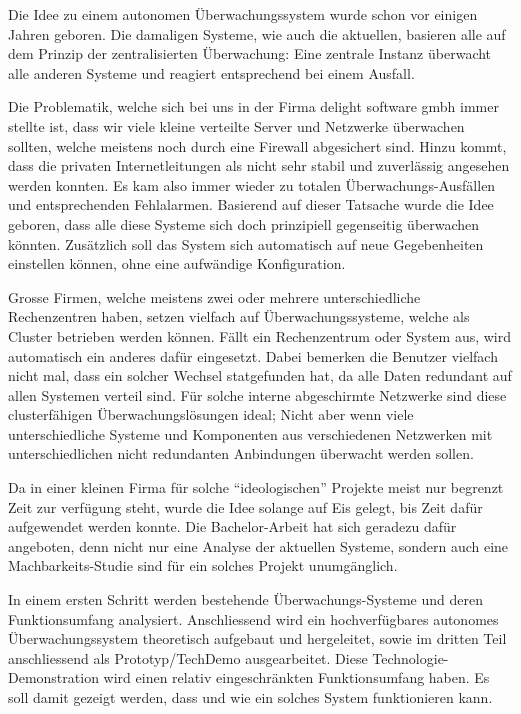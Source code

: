 
Die Idee zu einem autonomen \"Uberwachungssystem wurde schon vor einigen Jahren geboren. Die damaligen Systeme, wie auch die aktuellen, basieren alle auf dem Prinzip der zentralisierten \"Uberwachung: Eine zentrale Instanz \"uberwacht alle anderen Systeme und reagiert entsprechend bei einem Ausfall.

Die Problematik, welche sich bei uns in der Firma delight software gmbh immer stellte ist, dass wir viele kleine verteilte Server und Netzwerke \"uberwachen sollten, welche meistens noch durch eine Firewall abgesichert sind. Hinzu kommt, dass die privaten Internetleitungen als nicht sehr stabil und zuverl\"assig angesehen werden konnten. Es kam also immer wieder zu totalen \"Uberwachungs-Ausf\"allen und entsprechenden Fehlalarmen. Basierend auf dieser Tatsache wurde die Idee geboren, dass alle diese Systeme sich doch prinzipiell gegenseitig \"uberwachen k\"onnten. Zus\"atzlich soll das System sich automatisch auf neue Gegebenheiten einstellen k\"onnen, ohne eine aufw\"andige Konfiguration.

Grosse Firmen, welche meistens zwei oder mehrere unterschiedliche Rechenzentren haben, setzen vielfach auf \"Uberwachungssysteme, welche als Cluster betrieben werden k\"onnen. F\"allt ein Rechenzentrum oder System aus, wird automatisch ein anderes daf\"ur eingesetzt. Dabei bemerken die Benutzer vielfach nicht mal, dass ein solcher Wechsel statgefunden hat, da alle Daten redundant auf allen Systemen verteil sind. F\"ur solche interne abgeschirmte Netzwerke sind diese clusterf\"ahigen \"Uberwachungsl\"osungen ideal; Nicht aber wenn viele unterschiedliche Systeme und Komponenten aus verschiedenen Netzwerken mit unterschiedlichen nicht redundanten Anbindungen \"uberwacht werden sollen.

Da in einer kleinen Firma f\"ur solche "`ideologischen"' Projekte meist nur begrenzt Zeit zur verf\"ugung steht, wurde die Idee solange auf Eis gelegt, bis Zeit daf\"ur aufgewendet werden konnte. Die Bachelor-Arbeit hat sich geradezu daf\"ur angeboten, denn nicht nur eine Analyse der aktuellen Systeme, sondern auch eine Machbarkeits-Studie sind f\"ur ein solches Projekt unumg\"anglich.

In einem ersten Schritt werden bestehende \"Uberwachungs-Systeme und deren Funktionsumfang analysiert. Anschliessend wird ein hochverf\"ugbares autonomes \"Uberwachungssystem theoretisch aufgebaut und hergeleitet, sowie im dritten Teil anschliessend als Prototyp/TechDemo ausgearbeitet. Diese Technologie-Demonstration wird einen relativ eingeschr\"ankten Funktionsumfang haben. Es soll damit gezeigt werden, dass und wie ein solches System funktionieren kann.
